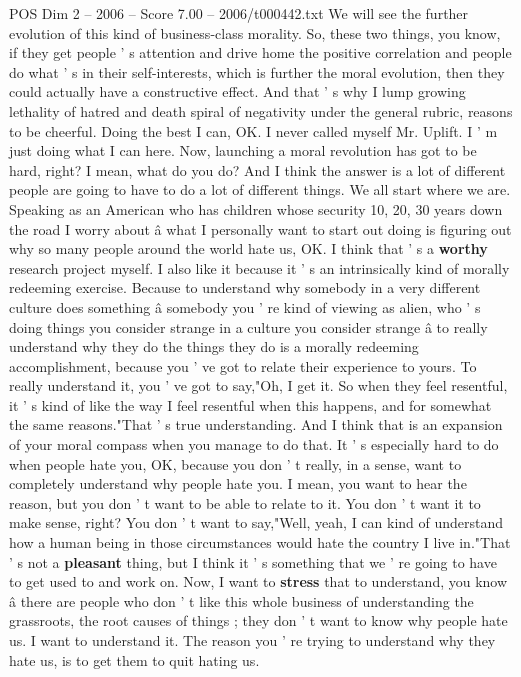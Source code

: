\begin{textsample}{POS Dim 2 – 2006 – Score 7.00 – 2006/t000442.txt}
We will see the further evolution of this kind of business-class morality.
So, these two things, you know, if they get people ' s attention and drive home the positive correlation and people do what ' s in their self-interests, which is further the moral evolution, then they could actually have a constructive effect.
And that ' s why I lump growing lethality of hatred and death spiral of negativity under the general rubric, reasons to be cheerful.
Doing the best I can, OK.
I never called myself Mr.
Uplift.
I ' m just doing what I can here.
Now, launching a moral revolution has got to be hard, right?
I mean, what do you do?
And I think the answer is a lot of different people are going to have to do a lot of different things.
We all start where we are.
Speaking as an American who has children whose security 10, 20, 30 years down the road I worry about â what I personally want to start out doing is figuring out why so many people around the world hate us, OK.
I think that ' s a \textbf{worthy} research project myself.
I also like it because it ' s an intrinsically kind of morally redeeming exercise.
Because to understand why somebody in a very different culture does something â somebody you ' re kind of viewing as alien, who ' s doing things you consider strange in a culture you consider strange â to really understand why they do the things they do is a morally redeeming accomplishment, because you ' ve got to relate their experience to yours.
To really understand it, you ' ve got to say,"Oh, I get it.
So when they feel resentful, it ' s kind of like the way I feel resentful when this happens, and for somewhat the same reasons."That ' s true understanding.
And I think that is an expansion of your moral compass when you manage to do that.
It ' s especially hard to do when people hate you, OK, because you don ' t really, in a sense, want to completely understand why people hate you.
I mean, you want to hear the reason, but you don ' t want to be able to relate to it.
You don ' t want it to make sense, right?
You don ' t want to say,"Well, yeah, I can kind of understand how a human being in those circumstances would hate the country I live in."That ' s not a \textbf{pleasant} thing, but I think it ' s something that we ' re going to have to get used to and work on.
Now, I want to \textbf{stress} that to understand, you know â there are people who don ' t like this whole business of understanding the grassroots, the root causes of things ; they don ' t want to know why people hate us.
I want to understand it.
The reason you ' re trying to understand why they hate us, is to get them to quit hating us.

\end{textsample}
